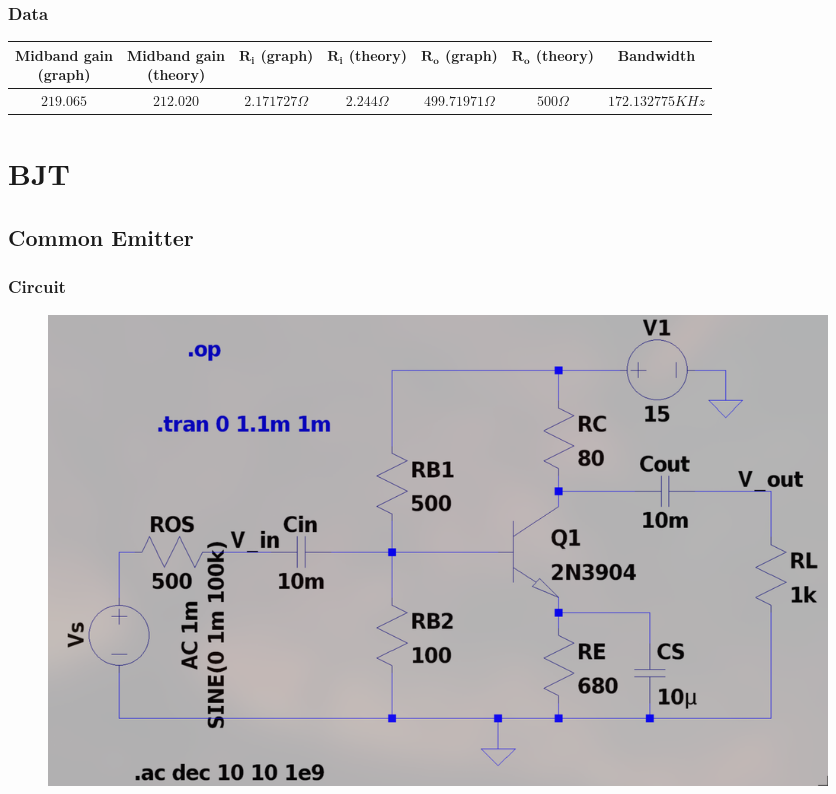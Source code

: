 \documentclass{article}
\begin{document}
\subsubsection{Data}

\begin{tabular}{|c|c|c|c|c|c|c|}
\hline
\makecell{\textbf{Midband gain} \\ \textbf{(graph)}} & \makecell{\textbf{Midband gain} \\ \textbf{(theory)}} & \makecell{$\mathbf{R_i}$ \\ \textbf{(graph)}} & \makecell{{$\mathbf{R_i}$} \\ \textbf{(theory)}} & \makecell{{$\mathbf{R_o}$} \\ \textbf{(graph)}} & \makecell{{$\mathbf{R_o}$} \\ \textbf{(theory)}} & \textbf{Bandwidth} \\
\hline
$219.065$ & $212.020$ & $2.171727\Omega$ & $2.244\Omega$& $499.71971 \Omega$ & $500\Omega$ & $172.132775 KHz$ \\
\hline
\end{tabular}
\pagebreak
\section{BJT}
\subsection{Common Emitter}
\subsubsection{Circuit}
\begin{figure}[h!]
        \centering
        \includegraphics[width=0.7\linewidth]{figs/bjt_ce_ckt.png}
    \end{figure}
\end{document}
